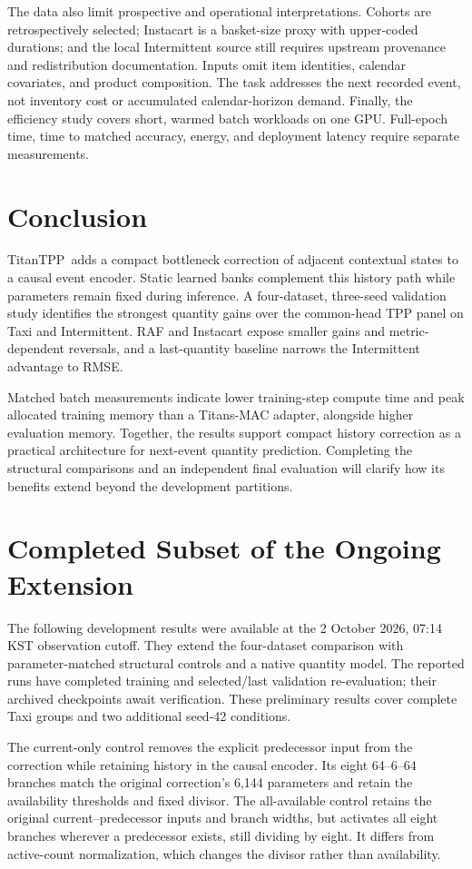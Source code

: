 \documentclass[runningheads]{llncs}
\newcommand{\method}{TitanTPP}
\begin{document}
The data also limit prospective and operational interpretations. Cohorts are
retrospectively selected; Instacart is a basket-size proxy with upper-coded
durations; and the local Intermittent source still requires upstream
provenance and redistribution documentation. Inputs omit item identities,
calendar covariates, and product composition. The task addresses the next
recorded event, not inventory cost or accumulated calendar-horizon demand.
Finally, the efficiency study covers short, warmed batch workloads on one
GPU. Full-epoch time, time to matched accuracy, energy, and deployment
latency require separate measurements.

\section{Conclusion}
\method\ adds a compact bottleneck correction of adjacent contextual states
to a causal event encoder. Static learned banks complement this history
path while parameters remain fixed during inference. A four-dataset,
three-seed validation study identifies the strongest quantity gains over
the common-head TPP panel on Taxi and Intermittent. RAF and Instacart expose
smaller gains and metric-dependent reversals, and a last-quantity baseline
narrows the Intermittent advantage to RMSE.

Matched batch measurements indicate lower training-step compute time and
peak allocated training memory than a Titans-MAC adapter, alongside higher
evaluation memory. Together, the results support compact history correction
as a practical architecture for next-event quantity prediction. Completing
the structural comparisons and an independent final evaluation will clarify
how its benefits extend beyond the development partitions.

\appendix
\section{Completed Subset of the Ongoing Extension}\label{app:extension}
The following development results were available at the 2 October 2026,
07:14 KST observation cutoff. They extend the four-dataset comparison with
parameter-matched structural controls and a native quantity model. The
reported runs have completed training and selected/last validation
re-evaluation; their archived checkpoints await verification. These
preliminary results cover complete Taxi groups and two additional seed-42
conditions.

The current-only control removes the explicit predecessor input from the
correction while retaining history in the causal encoder. Its eight
64--6--64 branches match the original correction's 6,144 parameters and
retain the availability thresholds and fixed divisor. The all-available
control retains the original current--predecessor inputs and branch widths,
but activates all eight branches wherever a predecessor exists, still
dividing by eight. It differs from active-count normalization, which changes
the divisor rather than availability.
\end{document}
